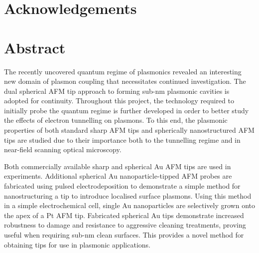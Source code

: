 \documentclass[12pt, a4paper, oneside]{book}
\begin{document}
\begin{singlespace}
\newpage
\section*{Acknowledgements}








\newpage
\section*{Abstract}

The recently uncovered quantum regime of plasmonics revealed an interesting new domain of plasmon coupling that necessitates continued investigation. The dual spherical AFM tip approach to forming sub-nm plasmonic cavities is adopted for continuity. Throughout this project, the technology required to initially probe the quantum regime is further developed in order to better study the effects of electron tunnelling on plasmons. To this end, the plasmonic properties of both standard sharp AFM tips and spherically nanostructured AFM tips are studied due to their importance both to the tunnelling regime and in near-field scanning optical microscopy.

Both commercially available sharp and spherical Au AFM tips are used in experiments. Additional spherical Au nanoparticle-tipped AFM probes are fabricated using pulsed electrodeposition to demonstrate a simple method for nanostructuring a tip to introduce localised surface plasmons. Using this method in a simple electrochemical cell, single Au nanoparticles are selectively grown onto the apex of a Pt AFM tip. Fabricated spherical Au tips demonstrate increased robustness to damage and resistance to aggressive cleaning treatments, proving useful when requiring sub-nm clean surfaces.
This provides a novel method for obtaining tips for use in plasmonic applications.


\end{singlespace}
\end{document}
